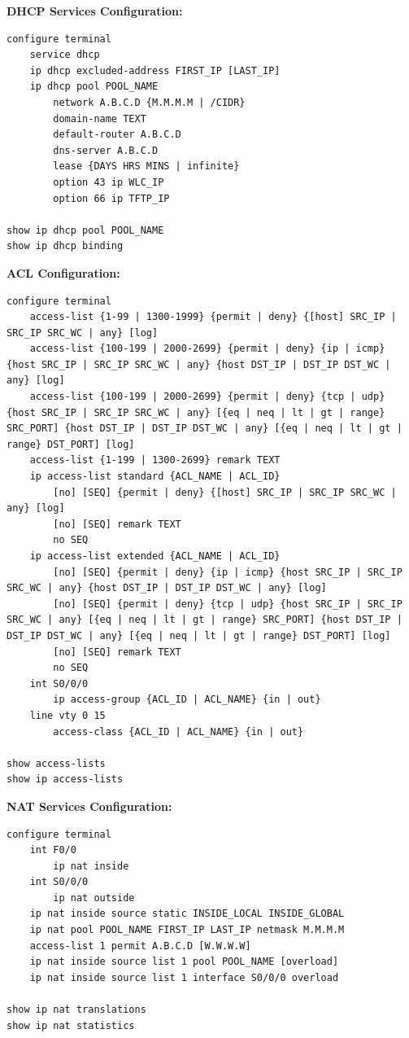 \documentclass[12pt]{article}
\begin{document}
	\noindent\textbf{DHCP Services Configuration:}
	\begin{lstlisting}
configure terminal
	service dhcp
	ip dhcp excluded-address FIRST_IP [LAST_IP]
	ip dhcp pool POOL_NAME
		network A.B.C.D {M.M.M.M | /CIDR}
		domain-name TEXT
		default-router A.B.C.D
		dns-server A.B.C.D
		lease {DAYS HRS MINS | infinite}
		option 43 ip WLC_IP
		option 66 ip TFTP_IP

show ip dhcp pool POOL_NAME
show ip dhcp binding
	\end{lstlisting}
	\vspace{8px}

	\noindent\textbf{ACL Configuration:}
	\begin{lstlisting}
configure terminal
	access-list {1-99 | 1300-1999} {permit | deny} {[host] SRC_IP | SRC_IP SRC_WC | any} [log]
	access-list {100-199 | 2000-2699} {permit | deny} {ip | icmp} {host SRC_IP | SRC_IP SRC_WC | any} {host DST_IP | DST_IP DST_WC | any} [log]
	access-list {100-199 | 2000-2699} {permit | deny} {tcp | udp} {host SRC_IP | SRC_IP SRC_WC | any} [{eq | neq | lt | gt | range} SRC_PORT] {host DST_IP | DST_IP DST_WC | any} [{eq | neq | lt | gt | range} DST_PORT] [log]
	access-list {1-199 | 1300-2699} remark TEXT
	ip access-list standard {ACL_NAME | ACL_ID}
		[no] [SEQ] {permit | deny} {[host] SRC_IP | SRC_IP SRC_WC | any} [log]
		[no] [SEQ] remark TEXT
		no SEQ
	ip access-list extended {ACL_NAME | ACL_ID}
		[no] [SEQ] {permit | deny} {ip | icmp} {host SRC_IP | SRC_IP SRC_WC | any} {host DST_IP | DST_IP DST_WC | any} [log]
		[no] [SEQ] {permit | deny} {tcp | udp} {host SRC_IP | SRC_IP SRC_WC | any} [{eq | neq | lt | gt | range} SRC_PORT] {host DST_IP | DST_IP DST_WC | any} [{eq | neq | lt | gt | range} DST_PORT] [log]
		[no] [SEQ] remark TEXT
		no SEQ
	int S0/0/0
		ip access-group {ACL_ID | ACL_NAME} {in | out}
	line vty 0 15
		access-class {ACL_ID | ACL_NAME} {in | out}

show access-lists
show ip access-lists
	\end{lstlisting}
	\vspace{8px}

	\noindent\textbf{NAT Services Configuration:}
	\begin{lstlisting}
configure terminal
	int F0/0
		ip nat inside
	int S0/0/0
		ip nat outside
	ip nat inside source static INSIDE_LOCAL INSIDE_GLOBAL
	ip nat pool POOL_NAME FIRST_IP LAST_IP netmask M.M.M.M
	access-list 1 permit A.B.C.D [W.W.W.W]
	ip nat inside source list 1 pool POOL_NAME [overload]
	ip nat inside source list 1 interface S0/0/0 overload

show ip nat translations
show ip nat statistics
	\end{lstlisting}
	\vspace{8px}
	
\end{document}

